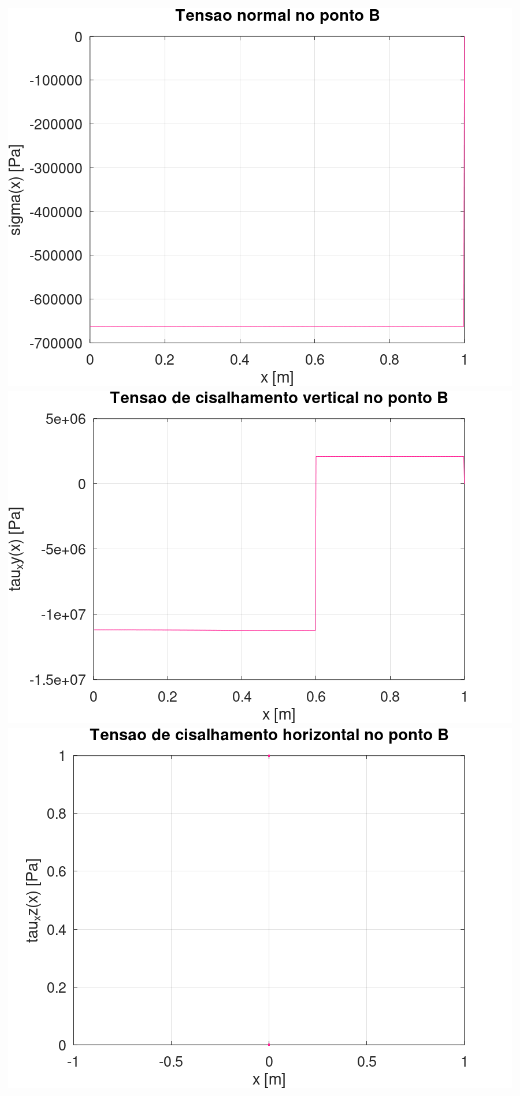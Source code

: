 \documentclass[10pt]{article}
\begin{document}
\begin{center}
    \includegraphics[scale=0.25]{figure18.png}
    \includegraphics[scale=0.25]{figure19.png}
    \includegraphics[scale=0.25]{figure20.png}

\end{center}
\end{document}
